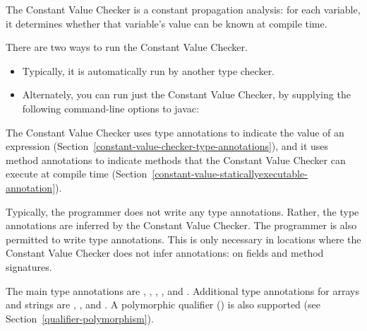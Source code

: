 \htmlhr
{}

The Constant Value Checker is a constant propagation analysis: for
each variable, it determines whether that variable's value can be
known at compile time.

There are two ways to run the Constant Value Checker.
\begin{itemize}
\item
Typically, it is automatically run by another type checker.
\item
Alternately, you can run just the Constant Value Checker, by
supplying the following command-line options to javac:
\end{itemize}



The Constant Value Checker uses type annotations to indicate the value of
an expression (Section~\ref{constant-value-checker-type-annotations}), and
it uses method annotations to indicate methods that the Constant Value
Checker can execute at compile time
(Section~\ref{constant-value-staticallyexecutable-annotation}).



Typically, the programmer does not write any type annotations.  Rather, the
type annotations are inferred by the Constant Value Checker.
The programmer is also permitted to write type annotations.  This is only necessary in
locations where the Constant Value Checker does not infer annotations:  on fields
and method signatures.

The main type annotations are
,
,
,
, and
.
Additional type annotations for arrays and strings are
,
,
and .
A polymorphic qualifier ()
is also supported (see Section~\ref{qualifier-polymorphism}).

